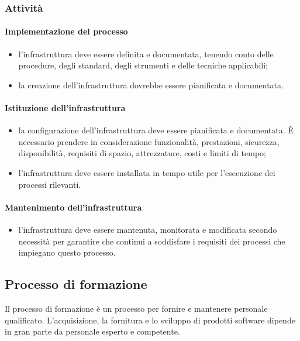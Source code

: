 		\subsubsection{Attività}
		\paragraph{Implementazione del processo}
		\begin{itemize}
			\item l'infrastruttura deve essere definita e documentata, tenendo conto delle procedure, degli standard, degli strumenti e delle tecniche applicabili;
			\item  la creazione dell'infrastruttura dovrebbe essere pianificata e documentata.
		\end{itemize}
		\paragraph{Istituzione dell'infrastruttura}
		\begin{itemize}
			\item la configurazione dell'infrastruttura deve essere pianificata e documentata. È necessario prendere in considerazione funzionalità, prestazioni, sicurezza, disponibilità, requisiti di spazio, attrezzature, costi e limiti di tempo;
			\item l'infrastruttura deve essere installata in tempo utile per l'esecuzione dei processi rilevanti.
		\end{itemize}
		\paragraph{Mantenimento dell'infrastruttura}
		\begin{itemize}
			\item l'infrastruttura deve essere mantenuta, monitorata e modificata secondo necessità per garantire che continui a soddisfare i requisiti dei processi che impiegano questo processo. 
		\end{itemize}
		
			
			
		
	
		
		
		
		
		\subsection{Processo di formazione}
		
	Il processo di formazione è un processo per fornire e mantenere personale qualificato. L'acquisizione, la fornitura e lo sviluppo  di prodotti software dipende in gran parte da personale esperto e competente. 
